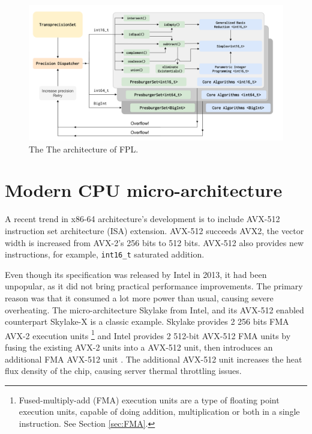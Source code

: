 \documentclass[logo,bsc,singlespacing,parskip]{infthesis}
\begin{document}
\begin{figure}
    \includegraphics[width=\linewidth]{image/transprecision.png}
    \caption{The The architecture of FPL.}
    \label{fig:fpl_arch}
\end{figure}

\section{Modern CPU micro-architecture}
\label{sec:avx512}

A recent trend in x86-64 architecture’s development is to include AVX-512
instruction set architecture (ISA) extension. AVX-512 succeeds AVX2, the vector
width is increased from AVX-2’s 256 bits to 512 bits. AVX-512 also provides new
instructions, for example, \texttt{int16\_t} saturated addition.


Even though its specification was released by Intel in 2013, it had been
unpopular, as it did not bring practical performance improvements. The primary
reason was that it consumed a lot more power than usual, causing severe
overheating. The micro-architecture Skylake from Intel, and its AVX-512 enabled
counterpart Skylake-X is a classic example. Skylake provides 2 256 bits FMA
AVX-2 execution units 
\footnote{Fused-multiply-add (FMA) execution units are a type of
floating point execution units, capable of doing addition, multiplication or
both in a single instruction. See Section \ref{sec:FMA}.} 
and Intel provides 2 512-bit AVX-512 FMA units by
fusing the existing AVX-2 units into a AVX-512 unit, then introduces an
additional FMA AVX-512 unit \cite{SLK-X}. The additional AVX-512 unit increases
the heat flux density of the chip, causing server thermal throttling issues. 
\end{document}
